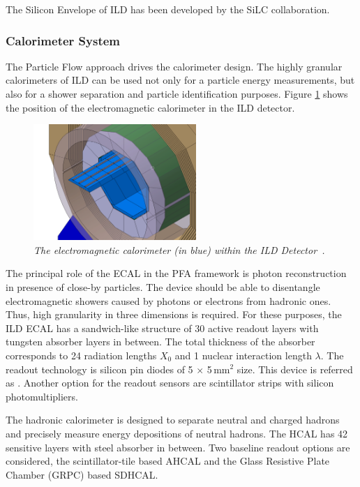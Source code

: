 The Silicon Envelope of ILD has been developed by the SiLC collaboration.

\subsubsection{Calorimeter System}

The Particle Flow approach drives the calorimeter design. The highly granular calorimeters of ILD can be used not only for a particle energy measurements, but also for a shower separation and particle identification purposes. 
Figure \ref{fig:ILCecal} shows the position of the electromagnetic calorimeter in the ILD detector.

\begin{figure}
	{\centering
		\includegraphics[width=0.55\textwidth]{graphics/ild-cal.png}
		\caption{\sl The electromagnetic calorimeter (in blue) within the ILD Detector~\cite{bib:ILC}.}
		\label{fig:ILCecal}
	}
\end{figure}

The principal role of the ECAL in the PFA framework is photon reconstruction in presence of close-by particles. The device should be able to disentangle electromagnetic showers caused by photons or electrons from hadronic ones. Thus, high granularity in three dimensions is required. For these purposes, the ILD ECAL has a sandwich-like structure of 30 active readout layers with tungsten absorber layers in between. The total thickness of the absorber corresponds to 24 radiation lengths $X_0$ and 1 nuclear interaction length $\lambda$. The readout technology is silicon pin diodes of 5 $\times$ 5\,mm$^2$ size. This device is referred as \ecal. Another option for the readout sensors are scintillator strips with silicon photomultipliers.

The hadronic calorimeter is designed to separate neutral and charged hadrons and precisely measure energy depositions of neutral hadrons. The HCAL has 42 sensitive layers with steel absorber in between. Two baseline readout options are considered, the scintillator-tile based AHCAL and the Glass Resistive Plate Chamber (GRPC) based SDHCAL.

